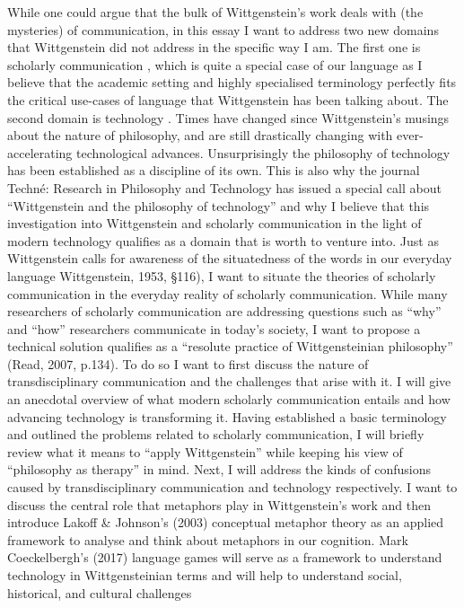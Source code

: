 While one could argue that the bulk of Wittgenstein’s work deals with
(the mysteries) of communication, in this essay I want to address two
new domains that Wittgenstein did not address in the specific way I am.
The first one is scholarly communication , which is quite a
special case of our language as I believe that the academic setting and
highly specialised terminology perfectly fits the critical use-cases of
language that Wittgenstein has been talking about. The second domain is
technology . Times have changed since Wittgenstein’s musings about
the nature of philosophy, and are still drastically changing with
ever-accelerating technological advances. Unsurprisingly the philosophy
of technology has been established as a discipline of its own. This is
also why the journal Techné: Research in Philosophy and
Technology has issued a special call about “Wittgenstein and the
philosophy of technology” and why I believe that this investigation
into Wittgenstein and scholarly communication in the light of modern
technology qualifies as a domain that is worth to venture into. Just as
Wittgenstein calls for awareness of the situatedness of the words in our
everyday language \cite{Wittgenstein1953}Wittgenstein, 1953, §116), I want to situate the
theories of scholarly communication in the everyday reality of scholarly
communication. While many researchers of scholarly communication are
addressing questions such as “why” and “how” researchers communicate
in today’s society, I want to propose a technical solution qualifies as
a “resolute practice of Wittgensteinian philosophy” (Read, 2007,
p.134). To do so I want to first discuss the nature of transdisciplinary
communication and the challenges that arise with it. I will give an
anecdotal overview of what modern scholarly communication entails and
how advancing technology is transforming it. Having established a basic
terminology and outlined the problems related to scholarly
communication, I will briefly review what it means to “apply
Wittgenstein” while keeping his view of “philosophy as therapy” in
mind. Next, I will address the kinds of confusions caused by
transdisciplinary communication and technology respectively. I want to
discuss the central role that metaphors play in Wittgenstein’s work and
then introduce Lakoff & Johnson’s (2003) conceptual metaphor
theory as an applied framework to analyse and think about metaphors in
our cognition. Mark Coeckelbergh’s (2017) language games will
serve as a framework to understand technology in Wittgensteinian terms
and will help to understand social, historical, and cultural challenges

